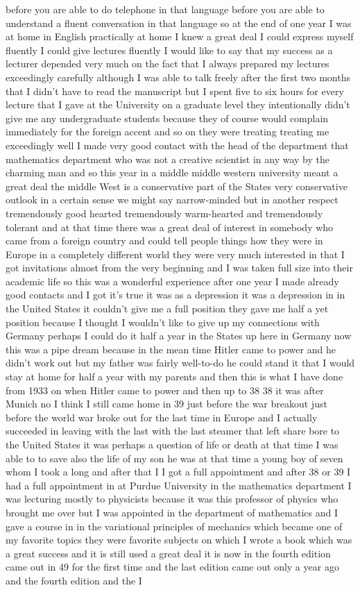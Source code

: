\documentclass{article}
\begin{document}
before you are able to do telephone in that language before you are able to understand a fluent conversation in that language so at the end of one year I was at home in English practically at home I knew a great deal I could express myself fluently I could give lectures fluently I would like to say that my success as a lecturer depended very much on the fact that I always prepared my lectures exceedingly carefully although I was able to talk freely after the first two months that I didn't have to read the manuscript but I spent five to six hours for every lecture that I gave at the University on a graduate level they intentionally didn't give me any undergraduate students because they of course would complain immediately for the foreign accent and so on they were treating treating me exceedingly well I made very good contact with the head of the department that mathematics department who was not a creative scientist in any way by the charming man and so this year in a middle middle western university meant a great deal the middle West is a conservative part of the States very conservative outlook in a certain sense we might say narrow-minded but in another respect tremendously good hearted tremendously warm-hearted and tremendously tolerant and at that time there was a great deal of interest in somebody who came from a foreign country and could tell people things how they were in Europe in a completely different world they were very much interested in that I got invitations almost from the very beginning and I was taken full size into their academic life so this was a wonderful experience after one year I made already good contacts and I got it's true it was as a depression it was a depression in in the United States it couldn't give me a full position they gave me half a yet position because I thought I wouldn't like to give up my connections with Germany perhaps I could do it half a year in the States up here in Germany now this was a pipe dream because in the mean time Hitler came to power and he didn't work out but my father was fairly well-to-do he could stand it that I would stay at home for half a year with my parents and then this is what I have done from 1933 on when Hitler came to power and then up to 38 38 it was after Munich no I think I still came home in 39 just before the war breakout just before the world war broke out for the last time in Europe and I actually succeeded in leaving with the last with the last steamer that left share bore to the United States it was perhaps a question of life or death at that time I was able to to save also the life of my son he was at that time a young boy of seven whom I took a long and after that I I got a full appointment and after 38 or 39 I had a full appointment in at Purdue University in the mathematics department I was lecturing mostly to physicists because it was this professor of physics who brought me over but I was appointed in the department of mathematics and I gave a course in in the variational principles of mechanics which became one of my favorite topics they were favorite subjects on which I wrote a book which was a great success and it is still used a great deal it is now in the fourth edition came out in 49 for the first time and the last edition came out only a year ago and the fourth edition and the I 
\end{document}
